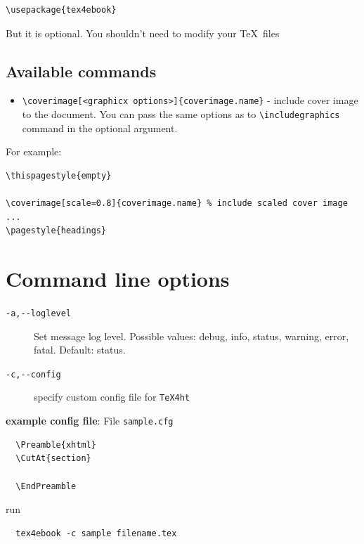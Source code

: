 \begin{verbatim}
\usepackage{tex4ebook}
\end{verbatim}

But it is optional. You shouldn't need to modify your \TeX~files

\hypertarget{available-commands}{%
\subsection{Available commands}\label{available-commands}}

\begin{itemize}
\tightlist
\item
  \texttt{\textbackslash{}coverimage{[}\textless{}graphicx\ options\textgreater{}{]}\{coverimage.name\}}
  - include cover image to the document. You can pass the same options
  as to \texttt{\textbackslash{}includegraphics} command in the optional
  argument.
\end{itemize}

For example:

\begin{verbatim}
\thispagestyle{empty}

\coverimage[scale=0.8]{coverimage.name} % include scaled cover image
...
\pagestyle{headings}
\end{verbatim}

\hypertarget{command-line-options}{%
\section{Command line options}\label{command-line-options}}

\begin{description}
\item[\texttt{-a,-\/-loglevel}]
Set message log level. Possible values: debug, info, status, warning,
error, fatal. Default: status.
\item[\texttt{-c,-\/-config}]
specify custom config file for \texttt{TeX4ht}
\end{description}

\textbf{example config file}: File \texttt{sample.cfg}

\begin{verbatim}
  \Preamble{xhtml}
  \CutAt{section}
  
  \EndPreamble
\end{verbatim}

run

\begin{verbatim}
  tex4ebook -c sample filename.tex
\end{verbatim}


